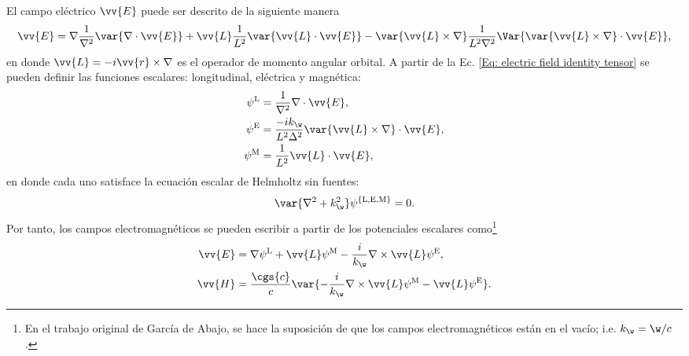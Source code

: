 El campo eléctrico $\vv{E}$ puede ser descrito de la siguiente manera \cite{Low}
\begin{equation}
\vv{E} = \nabla \frac{1}{\nabla^2}\var{\nabla\cdot\vv{E}} + \vv{L}\frac{1}{L^2}\var{\vv{L}\cdot\vv{E}}-\var{\vv{L}\times\nabla}\frac{1}{L^2\nabla^2}\Var{ \var{\vv{L}\times\nabla}\cdot\vv{E}},
\label{Eq: electric field identity tensor}
\end{equation}
en donde $\vv{L}=-i\vv{r}\times\nabla$ es el operador de momento angular orbital. A partir de la Ec. \eqref{Eq: electric field identity tensor} se pueden definir las funciones escalares: longitudinal, eléctrica y magnética: \cite{Low}
\begin{align}
\psi^{\rm L} &= \frac{1}{\nabla^2} \nabla\cdot \vv{E}, \\
\psi^{\rm E} &= \frac{-i k_\w}{L^2 \Delta^2}\var{\vv{L}\times\nabla}\cdot\vv{E}, \\
\psi^{\rm M} &= \frac{1}{L^2}\vv{L}\cdot\vv{E},
\end{align}
en donde cada uno satisface la ecuación escalar de Helmholtz sin fuentes:
\begin{equation}
\var{\nabla^2 + k_\w^2}\psi^{\{\rm L,E,M\}}=0.
\end{equation}
Por tanto, los campos electromagnéticos se pueden escribir a partir de los potenciales escalares como\footnote{En el trabajo original de García de Abajo, se hace la suposición de que los campos electromagnéticos están en el vacío; i.e. $k_\w = \w /c$.}
\begin{align}
\vv{E} &= \nabla\psi^{\rm L} + \vv{L}\psi^{\rm M}-\frac{i}{k_\w}\nabla\times\vv{L}\psi^{\rm E},\\
\vv{H} &= \frac{\cgs{c}}{c}\var{-\frac{i}{k_\w}\nabla\times\vv{L}\psi^{\rm M}-\vv{L}\psi^{\rm E}}.
\end{align} 

